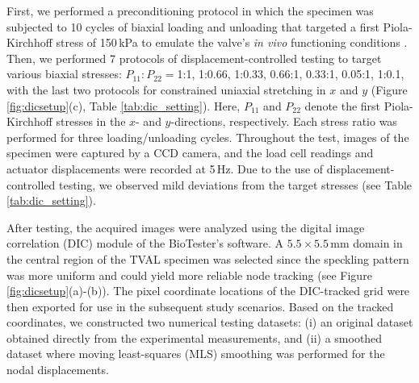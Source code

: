 \documentclass[twocolumn,10pt]{asme2ej}
\renewcommand{\~}{\tilde}
\renewcommand{\-}{\bar}
\newcommand{\8}{\infty}
\numberwithin{equation}{section}
\begin{document}
First, we performed a preconditioning protocol in which the specimen was subjected to 10 cycles of biaxial loading and unloading that targeted a first Piola-Kirchhoff stress of 150\,kPa to emulate the valve's \textit{in vivo} functioning conditions \cite{jett2018investigation}. Then, we performed 7 protocols of displacement-controlled testing to target various biaxial stresses: $P_{11}:P_{22}=$1:1, 1:0.66, 1:0.33, 0.66:1, 0.33:1, 0.05:1, 1:0.1, with the last two protocols for constrained uniaxial stretching in $x$ and $y$ (Figure  \ref{fig:dicsetup}(c), Table \ref{tab:dic_setting}). Here, $P_{11}$ and $P_{22}$ denote the first Piola-Kirchhoff stresses in the $x$- and $y$-directions, respectively. Each stress ratio was performed for three loading/unloading cycles. Throughout the test, images of the specimen were captured by a CCD camera, and the load cell readings and actuator displacements were recorded at 5\,Hz. Due to the use of displacement-controlled testing, we observed mild deviations from the target stresses (see Table \ref{tab:dic_setting}). 

After testing, the acquired images were analyzed using the digital image correlation (DIC) module of the BioTester's software. A $5.5\times5.5$\,mm domain in the central region of the TVAL specimen was selected since the speckling pattern was more uniform and could yield more reliable node tracking (see Figure \ref{fig:dicsetup}(a)-(b)). The pixel coordinate locations of the DIC-tracked grid were then exported for use in the subsequent study scenarios. Based on the tracked coordinates, we constructed two numerical testing datasets: (i) an original dataset obtained directly from the experimental measurements, and (ii) a smoothed dataset where moving least-squares (MLS) smoothing was performed for the nodal displacements. 
\end{document}
